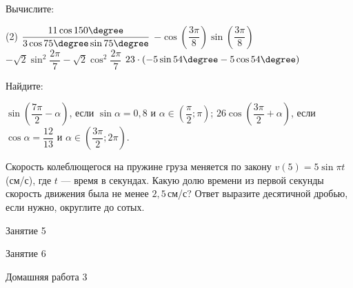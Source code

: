 \begin{homework}[number=2]
	\begin{listofex}
		\item Вычислите:
		\begin{tasks}(2)
			\task \( \dfrac{ 11\cos 150 \degree }{ 3\cos 75 \degree \sin 75 \degree } \)
			\task \( - \cos \left( \dfrac{ 3\pi }{ 8 }  \right) \sin \left( \dfrac{ 3\pi }{ 8 } \right) \)
			\task \( -\sqrt{2} \sin^2 \dfrac{ 2\pi }{ 7 } - \sqrt{2} \cos^2 \dfrac{ 2\pi }{ 7 }  \)
			\task \( 23 \cdot(-5 \sin 54 \degree - 5 \cos 54 \degree) \)
		\end{tasks}
		\item Найдите: %
		\begin{tasks}
			\task \( \sin \left( \dfrac{ 7\pi }{2  }-\alpha \right) \), если \( \sin \alpha = 0,8 \) и \( \alpha \in \left( \dfrac{ \pi }{ 2 }; \pi \right) \);
			\task \( 26 \cos \left( \dfrac{ 3\pi }{ 2 }+\alpha \right) \), если \( \cos \alpha = \dfrac{ 12 }{ 13 } \) и \( \alpha \in \left( \dfrac{ 3\pi }{ 2 }; 2 \pi \right) \).
		\end{tasks}
		\item Скорость колеблющегося на пружине груза меняется по закону \(v(5) = 5 \sin \pi t\) (см/с), где \(t\) --- время в секундах. Какую долю времени из первой секунды скорость движения была не менее \(2,5\) см/с? Ответ выразите десятичной дробью, если нужно, округлите до сотых.

	\end{listofex}
\end{homework}

\begin{class}[number=5]
	\begin{listofex}
		\item Занятие 5
	\end{listofex}
\end{class}

\begin{class}[number=6]
	\begin{listofex}
		\item Занятие 6
	\end{listofex}
\end{class}

\begin{homework}[number=3]
	\begin{listofex}
		\item Домашняя работа 3
	\end{listofex}
\end{homework}


